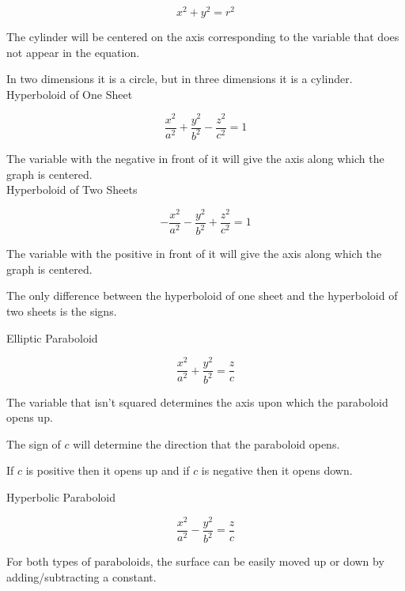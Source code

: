 \documentclass[11pt]{article}
\begin{document}
\[ x^{2}+y^{2}=r^{2}\]

The cylinder will be centered on the axis corresponding to the variable that does not appear in the equation. 

In two dimensions it is a circle, but in three dimensions it is a cylinder.\\

Hyperboloid of One Sheet

\[ \frac{x^{2}}{a^{2}} + \frac{y^{2}}{b^{2}} - \frac{z^{2}}{c^{2}} = 1\]

The variable with the negative in front of it will give the axis along which the graph is centered.\\

Hyperboloid of Two Sheets

\[ -\frac{x^{2}}{a^{2}} - \frac{y^{2}}{b^{2}} + \frac{z^{2}}{c^{2}} = 1 \]

The variable with the positive in front of it will give the axis along which the graph is centered. 

The only difference between the hyperboloid of one sheet and the hyperboloid of two sheets is the signs.

Elliptic Paraboloid

\[ \frac{x^{2}}{a^{2}} + \frac{y^{2}}{b^{2}} = \frac{z}{c} \]

The variable that isn’t squared determines the axis upon which the paraboloid opens up. 

The sign of $c$ will determine the direction that the paraboloid opens.

If $c$ is positive then it opens up and if $c$ is negative then it opens down.

Hyperbolic Paraboloid

\[ \frac{x^{2}}{a^{2}} - \frac{y^{2}}{b^{2}} = \frac{z}{c} \]

For both types of paraboloids, the surface can be easily moved up or down by adding/subtracting a constant.\\

\end{document}
